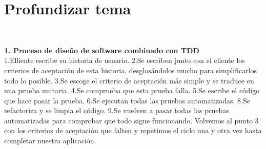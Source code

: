 \section{Profundizar tema} 
\textbf{}\\
\begin{flushleft}


\begin{itemize}
\textbf{1.	Proceso de diseño de software combinado con TDD }
\textbf{}\\
1.Elliente escribe su historia de usuario.
2.Se escriben junto con el cliente los criterios de aceptación de esta historia, desglosándolos mucho para simplificarlos todo lo posible.
3.Se escoge el criterio de aceptación más simple y se traduce en una prueba unitaria.
4.Se comprueba que esta prueba falla.
5.Se escribe el código que hace pasar la prueba.
6.Se ejecutan todas las pruebas automatizadas.
8.Se refactoriza y se limpia el código.
9.Se vuelven a pasar todas las pruebas automatizadas para comprobar que todo sigue funcionando.
Volvemos al punto 3 con los criterios de aceptación que falten y repetimos el ciclo una y otra vez hasta completar nuestra aplicación.

	


\end{itemize} 


\end{flushleft}
